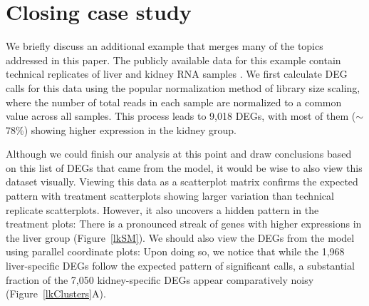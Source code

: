 \documentclass{bioinfo}
\begin{document}
\section{Closing case study}

We briefly discuss an additional example that merges many of the topics addressed in this paper. The publicly available data for this example contain technical replicates of liver and kidney RNA samples \citep{Marioni}. We first calculate DEG calls for this data using the popular normalization method of library size scaling, where the number of total reads in each sample are normalized to a common value across all samples. This process leads to 9,018 DEGs, with most of them ($\sim$78\%) showing higher expression in the kidney group.

Although we could finish our analysis at this point and draw conclusions based on this list of DEGs that came from the model, it would be wise to also view this dataset visually. Viewing this data as a scatterplot matrix confirms the expected pattern with treatment scatterplots showing larger variation than technical replicate scatterplots. However, it also uncovers a hidden pattern in the treatment plots: There is a pronounced streak of genes with higher expressions in the liver group (Figure~\ref{lkSM}). We should also view the DEGs from the model using parallel coordinate plots: Upon doing so, we notice that while the 1,968 liver-specific DEGs follow the expected pattern of significant calls, a substantial fraction of the 7,050 kidney-specific DEGs appear comparatively noisy (Figure~\ref{lkClusters}A).
\end{document}
